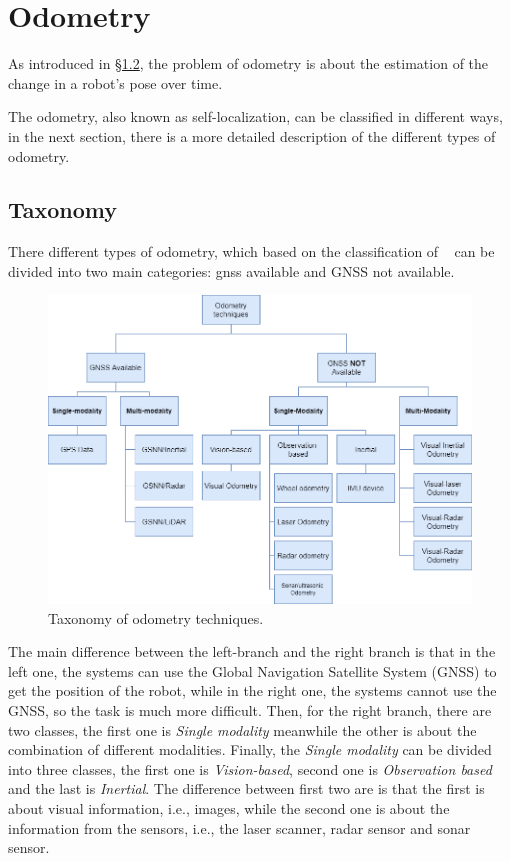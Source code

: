 \section{Odometry}\label{sec:visual-odometry}
As introduced in \hyperref[sec:the-problem]{\S1.2}, the problem of odometry is about the estimation of the change in a robot's pose over time.

The odometry, also known as self-localization, can be classified in different ways, in the next section, there is a more detailed description of the different types of odometry.

\subsection{Taxonomy}\label{subsec:tassonomy}
There different types of odometry, which based on the classification of ~\cite{vo_state_of_art} can be divided into two main categories: \gls{gnss} available and GNSS not available.
\begin{figure}[H]
    \centering
    \includegraphics[width=\textwidth]{images/2_2_taxonomy_odometry}
    \caption{Taxonomy of odometry techniques.}\label{fig:odometry-taxonomy}
\end{figure}
The main difference between the left-branch and the right branch is that in the left one, the systems can use the Global Navigation Satellite System (GNSS) to get the position of the robot, while in the right one, the systems cannot use the GNSS, so the task is much more difficult.
Then, for the right branch, there are two classes, the first one is \textit{Single modality} meanwhile the other is about the combination of different modalities.
Finally, the \textit{Single modality} can be divided into three classes, the first one is \textit{Vision-based}, second one is \textit{Observation based} and the last is \textit{Inertial}.
The difference between first two are is that the first is about visual information, i.e., images, while the second one is about the information from the sensors, i.e., the laser scanner, radar sensor and sonar sensor.

